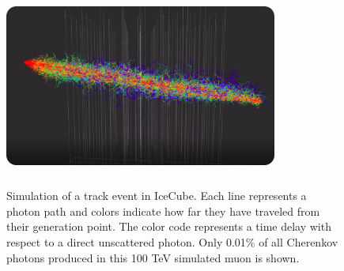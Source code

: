 \begin{figure}
\centering
\includegraphics[width=0.8\textwidth,height=2.6in]{chapter6/img/photons_track_rounded.png}
\caption{Simulation of a track event in IceCube. Each line represents a photon path and colors indicate how far they have traveled from their generation point. The color code represents a time delay with respect to a direct unscattered photon. Only 0.01\% of all Cherenkov photons produced in this 100 TeV simulated muon is shown.}
\label{fig:photonsimulation}
\end{figure}


